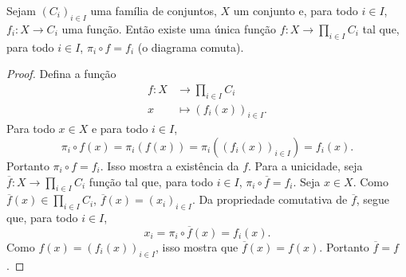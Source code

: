 \begin{prop}
Sejam $(C_i)_{i \in I}$ uma família de conjuntos, $X$ um conjunto e, para todo $i \in I$, $f_i: X \to C_i$ uma função. Então existe uma única função $f: X \to \prod_{i \in I} C_i$ tal que, para todo $i \in I$, $\pi_i \circ f = f_i$ (o diagrama comuta).
\begin{figure}
\centering
{}
\end{figure}
\end{prop}
\begin{proof}
Defina a função
	\begin{align*}
	f: X &\to \prod_{i \in I} C_i \\
		x &\mapsto (f_i(x))_{i \in I}.
	\end{align*}
Para todo $x \in X$ e para todo $i \in I$,
	\begin{equation*}
	\pi_i \circ f(x) = \pi_i (f(x)) = \pi_i ((f_i(x))_{i \in I}) = f_i(x).
	\end{equation*}
Portanto $\pi_i \circ f = f_i$. Isso mostra a existência da $f$. Para a unicidade, seja $\overline{f}: X \to \prod_{i \in I} C_i$ função tal que, para todo $i \in I$, $\pi_i \circ \overline{f} = f_i$. Seja $x \in X$.  Como $\overline{f}(x) \in \prod_{i \in I} C_i$, $\overline{f}(x) = (x_i)_{i \in I}$. Da propriedade comutativa de $\overline{f}$, segue que, para todo $i \in I$,
	\begin{equation*}
	x_i = \pi_i \circ \overline{f}(x) = f_i(x).
	\end{equation*}
Como $f(x) = (f_i(x))_{i \in I}$, isso mostra que $\overline{f}(x) = f(x)$. Portanto $\overline{f} = f$.
\end{proof}




